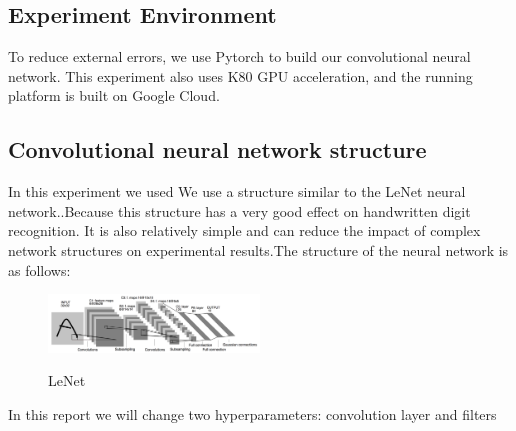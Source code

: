 \documentclass{article}
\begin{document}
\subsection{Experiment  Environment}

To reduce external errors, we use Pytorch to build our convolutional neural network. This experiment also uses K80 GPU acceleration, and the running platform is built on Google Cloud.

\subsection{Convolutional neural network structure}
In this experiment we used We use a structure similar to the LeNet neural network.\cite{LecunY.1998Glat}.Because this structure has a very good effect on handwritten digit recognition. It is also relatively simple and can reduce the impact of complex network structures on experimental results.The structure of the neural network is as follows:
\begin{figure}[H] %
	\centering %
	\includegraphics[width=0.5\textwidth]{./pic/part2/lenet.png} %
	\caption{LeNet} %
	\label{Fig.main2} %
	\cite{LecunY.1998Glat}
\end{figure}

In this report we will change two hyperparameters: convolution layer and filters
\end{document}
